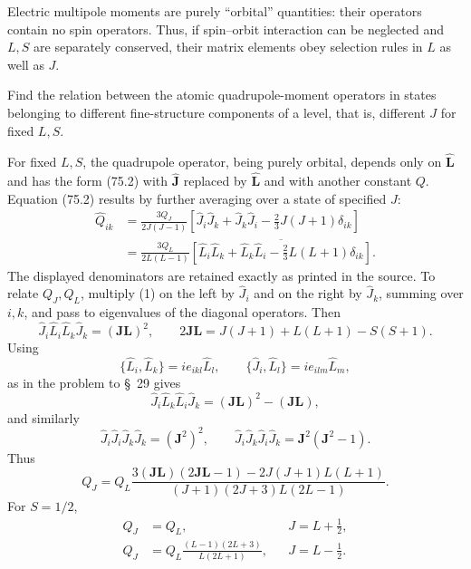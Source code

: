 Electric multipole moments are purely ``orbital'' quantities: their operators contain no spin operators. Thus, if spin--orbit interaction can be neglected and $L,S$ are separately conserved, their matrix elements obey selection rules in $L$ as well as $J$.

 Find the relation between the atomic quadrupole-moment operators in states belonging to different fine-structure components of a level, that is, different $J$ for fixed $L,S$.

\SolutionHeading For fixed $L,S$, the quadrupole operator, being purely orbital, depends only on $\widehat{\mathbf L}$ and has the form (75.2) with $\widehat{\mathbf J}$ replaced by $\widehat{\mathbf L}$ and with another constant $Q$. Equation (75.2) results by further averaging over a state of specified $J$:
\begin{equation}
\begin{split}
 \widehat Q_{ik}&=\frac{3Q_J}{2J(J-1)}[\widehat J_i\widehat J_k+\widehat J_k\widehat J_i-\tfrac23J(J+1)\delta_{ik}]\\
 &=\frac{3Q_L}{2L(L-1)}\overline{[\widehat L_i\widehat L_k+\widehat L_k\widehat L_i-\tfrac23L(L+1)\delta_{ik}]}.
\end{split}\tag{1}
\end{equation}
The displayed denominators are retained exactly as printed in the source. To relate $Q_J,Q_L$, multiply (1) on the left by $\widehat J_i$ and on the right by $\widehat J_k$, summing over $i,k$, and pass to eigenvalues of the diagonal operators. Then
\[\widehat J_i\widehat L_i\widehat L_k\widehat J_k=(\mathbf{JL})^2,\qquad 2\mathbf{JL}=J(J+1)+L(L+1)-S(S+1).\]
Using
\[\{\widehat L_i,\widehat L_k\}=ie_{ikl}\widehat L_l,\qquad \{\widehat J_i,\widehat L_l\}=ie_{ilm}\widehat L_m,\]
as in the problem to \S~29 gives
\[\widehat J_i\widehat L_k\widehat L_i\widehat J_k=(\mathbf{JL})^2-(\mathbf{JL}),\]
and similarly
\[\widehat J_i\widehat J_i\widehat J_k\widehat J_k=(\mathbf J^2)^2,\qquad \widehat J_i\widehat J_k\widehat J_i\widehat J_k=\mathbf J^2(\mathbf J^2-1).\]
Thus
\begin{equation}Q_J=Q_L\frac{3(\mathbf{JL})(2\mathbf{JL}-1)-2J(J+1)L(L+1)}{(J+1)(2J+3)L(2L-1)}.\tag{2}\end{equation}
For $S=1/2$,
\begin{equation}\begin{aligned}Q_J&=Q_L,&&J=L+\tfrac12,\\Q_J&=Q_L\frac{(L-1)(2L+3)}{L(2L+1)},&&J=L-\tfrac12.\end{aligned}\tag{3}\end{equation}

